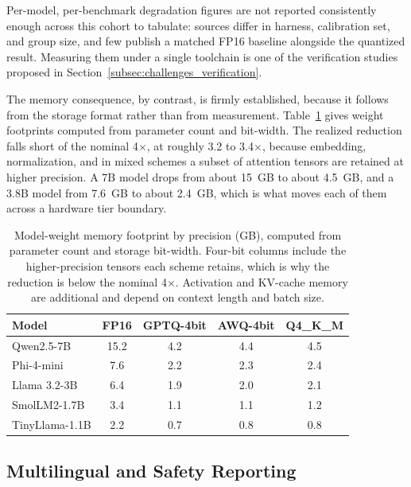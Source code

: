Per-model, per-benchmark degradation figures are not reported consistently
enough across this cohort to tabulate: sources differ in harness, calibration
set, and group size, and few publish a matched FP16 baseline alongside the
quantized result. Measuring them under a single toolchain is one of the
verification studies proposed in
Section~\ref{subsec:challenges_verification}.

The memory consequence, by contrast, is firmly established, because it follows
from the storage format rather than from measurement.
Table~\ref{tab:memory_footprint} gives weight footprints computed from parameter
count and bit-width. The realized reduction falls short of the nominal
4$\times$, at roughly 3.2 to 3.4$\times$, because embedding, normalization, and
in mixed schemes a subset of attention tensors are retained at higher precision.
A 7B model drops from about 15~GB to about 4.5~GB, and a 3.8B model from 7.6~GB
to about 2.4~GB, which is what moves each of them across a hardware tier
boundary.


\begin{table}[ht]
\centering
\caption{Model-weight memory footprint by precision (GB), computed from parameter count and storage bit-width. Four-bit columns include the higher-precision tensors each scheme retains, which is why the reduction is below the nominal 4$\times$. Activation and KV-cache memory are additional and depend on context length and batch size.}
\label{tab:memory_footprint}
\footnotesize
\begin{tabular}{lcccc}
\toprule
\textbf{Model} & \textbf{FP16} & \textbf{GPTQ-4bit} & \textbf{AWQ-4bit} & \textbf{Q4\_K\_M} \\
\midrule
Qwen2.5-7B & 15.2 & 4.2 & 4.4 & 4.5 \\
Phi-4-mini & 7.6 & 2.2 & 2.3 & 2.4 \\
Llama 3.2-3B & 6.4 & 1.9 & 2.0 & 2.1 \\
SmolLM2-1.7B & 3.4 & 1.1 & 1.1 & 1.2 \\
TinyLlama-1.1B & 2.2 & 0.7 & 0.8 & 0.8 \\
\bottomrule
\end{tabular}
\end{table}

\subsection{Multilingual and Safety Reporting}
\label{subsec:reported_safety}

